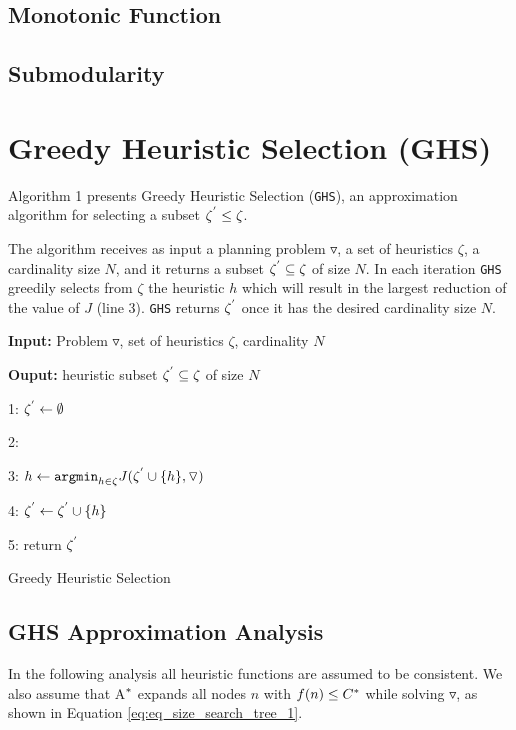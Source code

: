 \documentclass[a4paper,12pt]{article}
\begin{document}
\subsection{Monotonic Function}


\subsection{Submodularity}

\section{Greedy Heuristic Selection (GHS)}
Algorithm 1 presents Greedy Heuristic Selection (\texttt{GHS}), an approximation algorithm for selecting a subset $\zeta\sp{'} \leq \zeta$.

The algorithm receives as input a planning problem $\triangledown$, a set of heuristics $\zeta$, a cardinality size $N$, and it returns a subset $\zeta\sp{'} \subseteq \zeta$ of size $N$. In each iteration \texttt{GHS} greedily selects from $\zeta$ the heuristic $h$ which will result in the largest reduction of the value of $J$ (line 3). \texttt{GHS} returns $\zeta\sp{'}$ once it has the desired cardinality size $N$.\\


\begin{algorithm}[H]
 
 \textbf{Input:} Problem $\triangledown$, set  of heuristics $\zeta$, cardinality $N$
 
 \textbf{Ouput:} heuristic subset $\zeta\sp{'} \subseteq \zeta$ of size $N$
 
 1:  $\zeta\sp{'} \leftarrow \emptyset$
 
 2:   {
 
 3:  $h \leftarrow \texttt{argmin}_{h \in \zeta} J(\zeta\sp{'} \cup \{h\}, \triangledown) $
 
 4: $\zeta\sp{'} \leftarrow \zeta\sp{'} \cup \{h\}$
 
 5: return $\zeta\sp{'}$
 }
 \caption{Greedy Heuristic Selection}
\end{algorithm}

\subsection{GHS Approximation Analysis}
In the following analysis all heuristic functions are assumed to be consistent. We also assume that A$\sp{*}$ expands all nodes $n$ with $f(n) \leq C\sp{*}$ while solving $\triangledown$, as shown in Equation \eqref{eq:eq_size_search_tree_1}.
\end{document}
